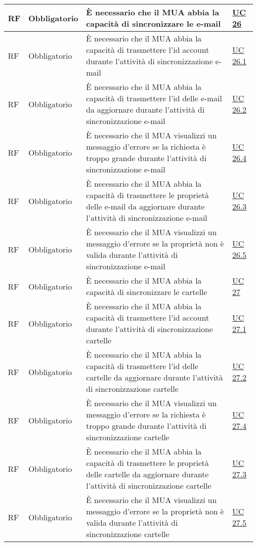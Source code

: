 \begin{longtable}{*{1}{>{\centering\arraybackslash}p{1.5cm}}*{1}{>{\centering\arraybackslash}p{2.5cm}}p{6cm}*{1}{>{\centering\arraybackslash}p{3cm}}}
    \\\hline
    RF & Obbligatorio & È necessario che il MUA abbia la capacità di sincronizzare le e-mail & \hyperref[sec:UC26]{UC 26}
    \\\hline
    RF & Obbligatorio & È necessario che il MUA abbia la capacità di trasmettere l'id account durante l'attività di sincronizzazione e-mail & \hyperref[sec:UC26.1]{UC 26.1}
    \\\hline
    RF & Obbligatorio & È necessario che il MUA abbia la capacità di trasmettere l'id delle e-mail da aggiornare durante l'attività di sincronizzazione e-mail & \hyperref[sec:UC26.2]{UC 26.2}
    \\\hline
    RF & Obbligatorio & È necessario che il MUA visualizzi un messaggio d'errore se la richiesta è troppo grande durante l'attività di sincronizzazione e-mail & \hyperref[sec:UC26.4]{UC 26.4}
    \\\hline
    RF & Obbligatorio & È necessario che il MUA abbia la capacità di trasmettere le proprietà delle e-mail da aggiornare durante l'attività di sincronizzazione e-mail & \hyperref[sec:UC26.3]{UC 26.3}
    \\\hline
    RF & Obbligatorio & È necessario che il MUA visualizzi un messaggio d'errore se la proprietà non è valida durante l'attività di sincronizzazione e-mail & \hyperref[sec:UC26.5]{UC 26.5}
    \\\hline
    RF & Obbligatorio & È necessario che il MUA abbia la capacità di sincronizzare le cartelle & \hyperref[sec:UC27]{UC 27}
    \\\hline
    RF & Obbligatorio & È necessario che il MUA abbia la capacità di trasmettere l'id account durante l'attività di sincronizzazione cartelle & \hyperref[sec:UC27.1]{UC 27.1}
    \\\hline
    RF & Obbligatorio & È necessario che il MUA abbia la capacità di trasmettere l'id delle cartelle da aggiornare durante l'attività di sincronizzazione cartelle & \hyperref[sec:UC27.2]{UC 27.2}
    \\\hline
    RF & Obbligatorio & È necessario che il MUA visualizzi un messaggio d'errore se la richiesta è troppo grande durante l'attività di sincronizzazione cartelle & \hyperref[sec:UC27.4]{UC 27.4}
    \\\hline
    RF & Obbligatorio & È necessario che il MUA abbia la capacità di trasmettere le proprietà delle cartelle da aggiornare durante l'attività di sincronizzazione cartelle & \hyperref[sec:UC27.3]{UC 27.3}
    \\\hline
    RF & Obbligatorio & È necessario che il MUA visualizzi un messaggio d'errore se la proprietà non è valida durante l'attività di sincronizzazione cartelle & \hyperref[sec:UC27.5]{UC 27.5}

\end{longtable}
